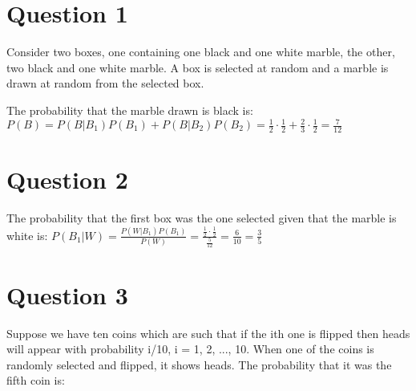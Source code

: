 \documentclass{article}
\begin{document}
\newcommand{\documentcourse}{IIMT2641}
\newcommand{\documentnumber}{1}





\section*{Question 1}

Consider two boxes, one containing one black and one white marble, the other, two black and one white marble. A box is selected at random and a marble is drawn at random from the selected box.

The probability that the marble drawn is black is:
$ P(B) = P(B|B_1)P(B_1) + P(B|B_2)P(B_2) = \frac{1}{2} \cdot \frac{1}{2} + \frac{2}{3} \cdot \frac{1}{2} = \frac{7}{12} $

\section*{Question 2}

The probability that the first box was the one selected given that the marble is white is:
$P(B_1|W) = \frac{P(W|B_1)P(B_1)}{P(W)} = \frac{\frac{1}{2} \cdot \frac{1}{2}}{\frac{5}{12}} = \frac{6}{10} = \frac{3}{5}$

\section*{Question 3}

Suppose we have ten coins which are such that if the ith one is flipped then heads will appear with probability i/10, i = 1, 2, ..., 10. When one of the coins is randomly selected and flipped, it shows heads. The  probability that it was the fifth coin is:
\end{document}
